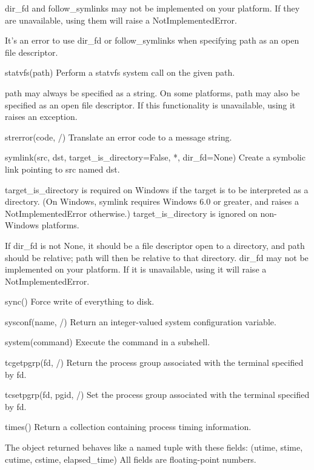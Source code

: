 \documentclass{article}
\begin{document}
        dir_fd and follow_symlinks may not be implemented
          on your platform.  If they are unavailable, using them will raise a
          NotImplementedError.

        It's an error to use dir_fd or follow_symlinks when specifying path as
          an open file descriptor.

    statvfs(path)
        Perform a statvfs system call on the given path.

        path may always be specified as a string.
        On some platforms, path may also be specified as an open file descriptor.
          If this functionality is unavailable, using it raises an exception.

    strerror(code, /)
        Translate an error code to a message string.

    symlink(src, dst, target_is_directory=False, *, dir_fd=None)
        Create a symbolic link pointing to src named dst.

        target_is_directory is required on Windows if the target is to be
          interpreted as a directory.  (On Windows, symlink requires
          Windows 6.0 or greater, and raises a NotImplementedError otherwise.)
          target_is_directory is ignored on non-Windows platforms.

        If dir_fd is not None, it should be a file descriptor open to a directory,
          and path should be relative; path will then be relative to that directory.
        dir_fd may not be implemented on your platform.
          If it is unavailable, using it will raise a NotImplementedError.

    sync()
        Force write of everything to disk.

    sysconf(name, /)
        Return an integer-valued system configuration variable.

    system(command)
        Execute the command in a subshell.

    tcgetpgrp(fd, /)
        Return the process group associated with the terminal specified by fd.

    tcsetpgrp(fd, pgid, /)
        Set the process group associated with the terminal specified by fd.

    times()
        Return a collection containing process timing information.

        The object returned behaves like a named tuple with these fields:
          (utime, stime, cutime, cstime, elapsed_time)
        All fields are floating-point numbers.
\end{document}
